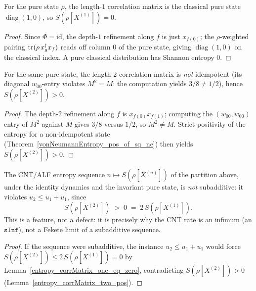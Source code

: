 \begin{lemma}\label{entropy_corrMatrix_one_eq_zero}
  \leanok
  For the pure state \(\rho\), the length-\(1\) correlation matrix is the classical pure state
  \(\operatorname{diag}(1,0)\), so \(S(\rho[X^{(1)}]) = 0\).
\end{lemma}
\begin{proof}\leanok
  Since \(\Phi = \mathrm{id}\), the depth-\(1\) refinement along \(f\) is just \(x_{f(0)}\); the
  \(\rho\)-weighted pairing \(\operatorname{tr}(\rho\,x_g^{\dagger}x_f)\) reads off column \(0\) of the pure state,
  giving \(\operatorname{diag}(1,0)\) on the classical index. A pure classical distribution has
  Shannon entropy \(0\).
\end{proof}

\begin{lemma}\label{entropy_corrMatrix_two_pos}
  \leanok
  For the same pure state, the length-\(2\) correlation matrix is \emph{not} idempotent (its
  diagonal \(w_{00}\)-entry violates \(M^{2} = M\): the computation yields \(3/8\ne 1/2\)), hence
  \(S(\rho[X^{(2)}]) > 0\).
\end{lemma}
\begin{proof}\leanok
  The depth-\(2\) refinement along \(f\) is \(x_{f(0)}x_{f(1)}\); computing the \((w_{00},w_{00})\)
  entry of \(M^{2}\) against \(M\) gives \(3/8\) versus \(1/2\), so \(M^{2}\ne M\). Strict positivity
  of the entropy for a non-idempotent state (Theorem~\ref{vonNeumannEntropy_pos_of_sq_ne}) then
  yields \(S(\rho[X^{(2)}]) > 0\).
\end{proof}

\begin{theorem}\label{not_subadditive_cnt_entropySeq}
  \leanok
  The CNT/ALF entropy sequence \(n\mapsto S(\rho[X^{(n)}])\) of the partition above, under the
  identity dynamics and the invariant pure state, is \emph{not} subadditive: it violates
  \(u_2\le u_1 + u_1\), since
  \[
    S(\rho[X^{(2)}]) \;>\; 0 \;=\; 2\,S(\rho[X^{(1)}]).
  \]
  This is a feature, not a defect: it is precisely why the CNT rate is an infimum (an \(\texttt{sInf}\)),
  not a Fekete limit of a subadditive sequence.
\end{theorem}
\begin{proof}\leanok
  If the sequence were subadditive, the instance \(u_2\le u_1 + u_1\) would force
  \(S(\rho[X^{(2)}])\le 2\,S(\rho[X^{(1)}]) = 0\) by Lemma~\ref{entropy_corrMatrix_one_eq_zero},
  contradicting \(S(\rho[X^{(2)}]) > 0\) (Lemma~\ref{entropy_corrMatrix_two_pos}).
\end{proof}


